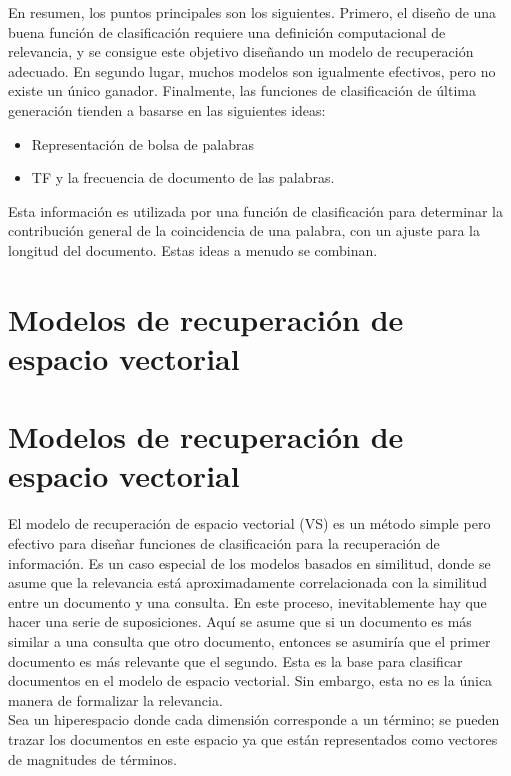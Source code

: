 En resumen, los puntos principales son los siguientes. Primero, el diseño de una buena función de clasificación requiere una definición computacional de relevancia, y se consigue este objetivo diseñando un modelo de recuperación adecuado. En segundo lugar, muchos modelos son igualmente efectivos, pero no existe un único ganador. Finalmente, las funciones de clasificación de última generación tienden a basarse en las siguientes ideas: 
\begin{itemize}
\item Representación de bolsa de palabras
\item TF y la frecuencia de documento de las palabras. 
\end{itemize}

Esta información es utilizada por una función de clasificación para determinar la contribución general de la coincidencia de una palabra, con un ajuste para la longitud del documento. Estas ideas a menudo se combinan.

\section{Modelos de recuperación de espacio vectorial}

\section{Modelos de recuperación de espacio vectorial}

El modelo de recuperación de espacio vectorial (VS) es un método simple pero efectivo para diseñar funciones de clasificación para la recuperación de información. Es un caso especial de los modelos basados en similitud, donde se asume que la relevancia está aproximadamente correlacionada con la similitud entre un documento y una consulta. En este proceso, inevitablemente hay que hacer una serie de suposiciones. Aquí se asume que si un documento es más similar a una consulta que otro documento, entonces se asumiría que el primer documento es más relevante que el segundo. Esta es la base para clasificar documentos en el modelo de espacio vectorial. Sin embargo, esta no es la única manera de formalizar la relevancia. \\

Sea un hiperespacio donde cada dimensión corresponde a un término; se pueden trazar los documentos en este espacio ya que están representados como vectores de magnitudes de términos. \\

